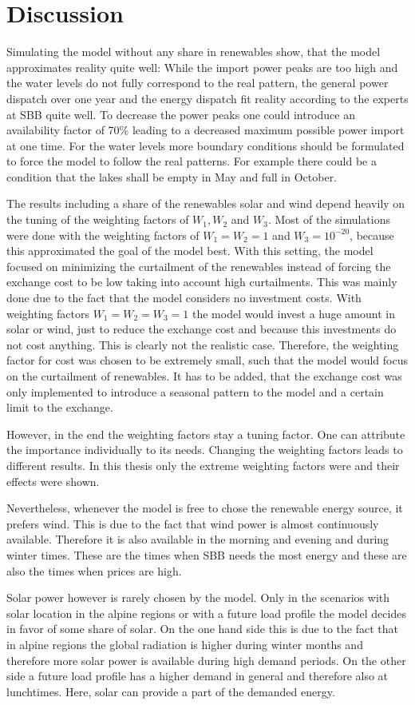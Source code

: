 \chapter{Discussion}
Simulating the model without any share in renewables show, that the model approximates reality quite well: While the import power peaks are too high and the water levels do not fully correspond to the real pattern, the general power dispatch over one year and the energy dispatch fit reality according to the experts at SBB quite well. To decrease the power peaks one could introduce an availability factor of 70\% leading to a decreased maximum possible power import at one time. For the water levels more boundary conditions should be formulated to force the model to follow the real patterns. For example there could be a condition that the lakes shall be empty in May and full in October. 

The results including a share of the renewables solar and wind depend heavily on the tuning of the weighting factors of $W_1, W_2$ and $W_3$.
Most of the simulations were done with the weighting factors of $W_1 = W_2 = 1$ and $W_3 = 10^{-20}$, because this approximated the goal of the model best. With this setting, the model focused on minimizing the curtailment of the renewables instead of forcing the exchange cost to be low taking into account high curtailments. This was mainly done due to the fact that the model considers no investment costs. With weighting factors $W_1 = W_2 = W_3 = 1$ the model would invest a huge amount in solar or wind, just to reduce the exchange cost and because this investments do not cost anything. This is clearly not the realistic case. Therefore, the weighting factor for cost was chosen to be extremely small, such that the model would focus on the curtailment of renewables. It has to be added, that the exchange cost was only implemented to introduce a seasonal pattern to the model and a certain limit to the exchange. 

However, in the end the weighting factors stay a tuning factor. One can attribute the importance individually to its needs. Changing the weighting factors leads to different results. In this thesis only the extreme weighting factors were and their effects were shown. 

Nevertheless, whenever the model is free to chose the renewable energy source, it prefers wind. This is due to the fact that wind power is almost continuously available. Therefore it is also available in the morning and evening and during winter times. These are the times when SBB needs the most energy and these are also the times when prices are high. 

Solar power however is rarely chosen by the model. Only in the scenarios with solar location in the alpine regions or with a future load profile the model decides in favor of some share of solar. On the one hand side this is due to the fact that in alpine regions the global radiation is higher during winter months and therefore more solar power is available during high demand periods. On the other side a future load profile has a higher demand in general and therefore also at lunchtimes. Here, solar can provide a part of the demanded energy. 
